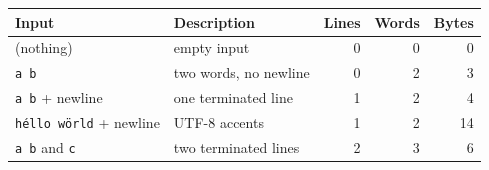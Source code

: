 \begin{tabular}{llrrr}
\toprule
Input & Description & Lines & Words & Bytes \\
\midrule
(nothing) & empty input & 0 & 0 & 0 \\
\texttt{a b} & two words, no newline & 0 & 2 & 3 \\
\texttt{a b} + newline & one terminated line & 1 & 2 & 4 \\
\texttt{h\'ello w\"orld} + newline & UTF-8 accents & 1 & 2 & 14 \\
\texttt{a b} and \texttt{c} & two terminated lines & 2 & 3 & 6 \\
\bottomrule
\end{tabular}
